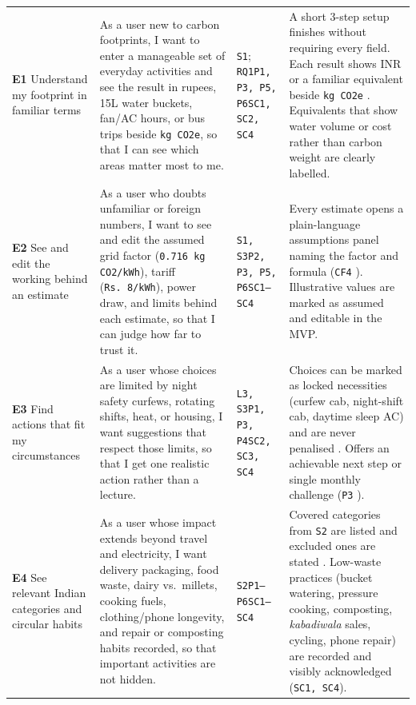 \documentclass[12pt, a4paper]{article}
\begin{document}
{\begin{longtable}{|>{\raggedright\arraybackslash}p{2.7cm}|>{\raggedright\arraybackslash}p{5.2cm}|>{\raggedright\arraybackslash}p{2.9cm}|>{\raggedright\arraybackslash}p{5.2cm}|}
\rowcolor{bgSand}\multicolumn{4}{|l|}{\textbf{\textcolor{cTerracotta}{MUST HAVE: The Core Journey and Its Trustworthiness}}} \\
\hline
\textbf{E1} Understand my footprint in familiar terms & As a user new to carbon footprints, I want to enter a manageable set of everyday activities and see the result in rupees, 15L water buckets, fan/AC hours, or bus trips beside \texttt{kg CO2e}, so that I can see which areas matter most to me. & \texttt{S1}; \texttt{RQ1}\newline \texttt{P1, P3, P5, P6}\newline \texttt{SC1, SC2, SC4} & A short 3-step setup finishes without requiring every field. Each result shows INR or a familiar equivalent beside \texttt{kg CO2e} \cite{mohanty2023,cf1,cf6,cf8}. Equivalents that show water volume or cost rather than carbon weight are clearly labelled. \\
\hline
\textbf{E2} See and edit the working behind an estimate & As a user who doubts unfamiliar or foreign numbers, I want to see and edit the assumed grid factor (\texttt{0.716 kg CO2/kWh}), tariff (\texttt{Rs.\ 8/kWh}), power draw, and limits behind each estimate, so that I can judge how far to trust it. & \texttt{S1, S3}\newline \texttt{P2, P3, P5, P6}\newline \texttt{SC1--SC4} & Every estimate opens a plain-language assumptions panel naming the factor and formula (\texttt{CF4} \cite{cf4}). Illustrative values are marked as assumed and editable in the MVP. \\
\hline
\textbf{E3} Find actions that fit my circumstances & As a user whose choices are limited by night safety curfews, rotating shifts, heat, or housing, I want suggestions that respect those limits, so that I get one realistic action rather than a lecture. & \texttt{L3, S3}\newline \texttt{P1, P3, P4}\newline \texttt{SC2, SC3, SC4} & Choices can be marked as locked necessities (curfew cab, night-shift cab, daytime sleep AC) and are never penalised \cite{brynjarsdottir2012,cf1,cf9}. Offers an achievable next step or single monthly challenge (\texttt{P3} \cite{cf2,cf10}). \\
\hline
\textbf{E4} See relevant Indian categories and circular habits & As a user whose impact extends beyond travel and electricity, I want delivery packaging, food waste, dairy vs.\ millets, cooking fuels, clothing/phone longevity, and repair or composting habits recorded, so that important activities are not hidden. & \texttt{S2}\newline \texttt{P1--P6}\newline \texttt{SC1--SC4} & Covered categories from \texttt{S2} are listed and excluded ones are stated \cite{shi2021,cf1,cf3,cf4,cf10}. Low-waste practices (bucket watering, pressure cooking, composting, \textit{kabadiwala} sales, cycling, phone repair) are recorded and visibly acknowledged (\texttt{SC1, SC4}). \\

\end{longtable}}
\end{document}
